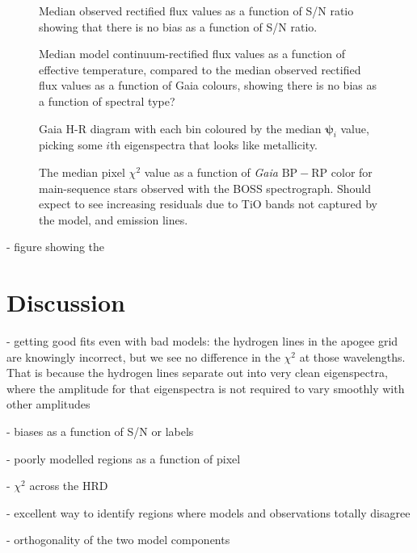 \documentclass[modern]{aastex631}
\newcommand{\vecpsi}{\boldsymbol{\psi}}
\newcommand{\todo}[1]{\textcolor{tab:blue}{#1}}
\begin{document}
\begin{figure}
    \caption{Median observed rectified flux values as a function of S/N ratio showing that there is no bias as a function of S/N ratio.}
\end{figure}


\begin{figure}
    \caption{Median model continuum-rectified flux values as a function of effective temperature, compared to the median observed rectified flux values as a function of Gaia colours, showing there is no bias as a function of spectral type?}
\end{figure}


\begin{figure}
    \caption{Gaia H-R diagram with each bin coloured by the median $\vecpsi_i$ value, picking some $i$th eigenspectra that looks like metallicity. \label{fig:gaia_hrd_metallicity}}
\end{figure}


\begin{figure*}
    \caption{The median pixel $\chi^2$ value as a function of \emph{Gaia} $\mathrm{BP} - \mathrm{RP}$ color for main-sequence stars observed with the BOSS spectrograph. \todo{Should expect to see increasing residuals due to TiO bands not captured by the model, and emission lines.}}
\end{figure*}


- figure showing the 

\section{Discussion}\label{sec:discussion}

- getting good fits even with bad models: the hydrogen lines in the apogee grid are knowingly incorrect, but we see no difference in the $\chi^2$ at those wavelengths. That is because the hydrogen lines separate out into very clean eigenspectra, where the amplitude for that eigenspectra is not required to vary smoothly with other amplitudes

- biases as a function of S/N or labels

- poorly modelled regions as a function of pixel

- $\chi^2$ across the HRD

- excellent way to identify regions where models and observations totally disagree

- orthogonality of the two model components
\end{document}
